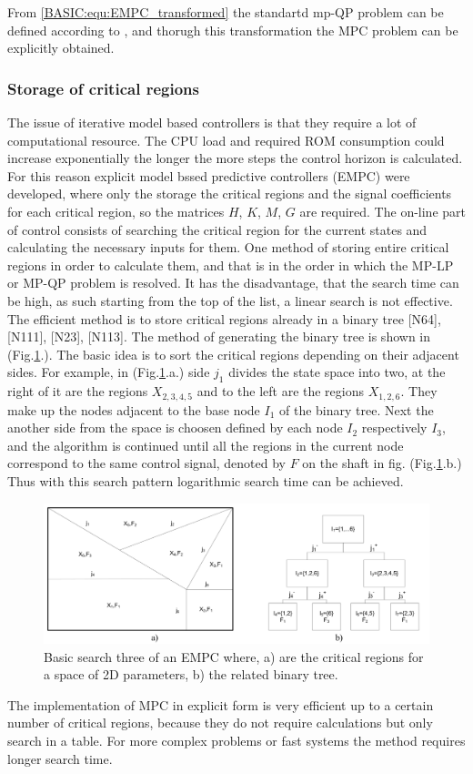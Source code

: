 		From \ref{BASIC:equ:EMPC_transformed} the standartd mp-QP problem can be defined according to \cite{borrelli2017predictive}, and thorugh this transformation the MPC problem can be explicitly obtained. 
		

\subsubsection{Storage of critical regions}

The issue of iterative model based controllers is that they require a lot of computational resource. The CPU load and required ROM consumption could increase exponentially the longer the more steps the control horizon is calculated. For this reason explicit model bssed predictive controllers (EMPC) were developed, where only the storage the critical regions and the signal coefficients for each critical region, so the matrices $H$, $K$, $M$, $G$ are required. The on-line part of control consists of searching the critical region for the current states and calculating the necessary inputs for them.
One method of storing entire critical regions in order to calculate them, and that is in the order in which the MP-LP or MP-QP problem is resolved. It has the disadvantage, that the search time can be high, as such starting from the top of the list, a linear search is not effective. The efficient method is to store critical regions already in a binary tree [N64], [N111], [N23], [N113]. The method of generating the binary tree is shown in (Fig.\ref{BASIC:fig:searchtree}.). The basic idea is to sort the critical regions
depending on their adjacent sides. For example, in (Fig.\ref{BASIC:fig:searchtree}.a.) side $j_1$ divides the state space into two, at the right of it are the regions $X_{2,3,4,5}$ and to the left are the regions $X_{1,2,6}$. They make up the nodes adjacent to the base node $I_1$ of the binary tree. Next the another side from the space is choosen defined by each node $I_2$ respectively $I_3$, and the algorithm is continued until all the regions in the current node correspond to the same control signal, denoted by $F$ on the shaft in fig. (Fig.\ref{BASIC:fig:searchtree}.b.) Thus with this search pattern logarithmic search time can be achieved.

 \begin{figure}[!ht]
        \centering
        \includegraphics[width=\textwidth]{EMPC_PNG_Pics/BasicSearchTree.png}
        \caption{Basic search three of an EMPC where, a) are the critical regions for a space of 2D parameters,
b) the related binary tree.}
        \label{BASIC:fig:searchtree}
    \end{figure}

The implementation of MPC in explicit form is very efficient up to a certain number of critical regions, because they do not require calculations but only search in a table. For more complex problems or fast systems the method requires longer search time.

